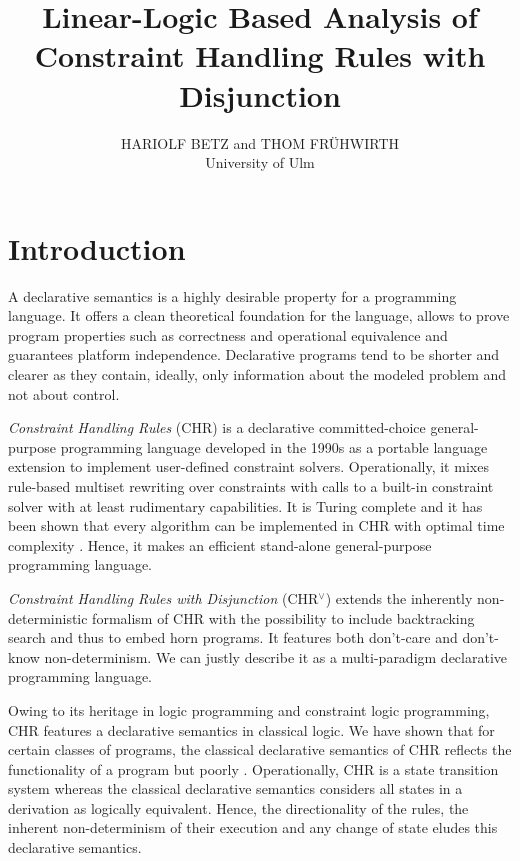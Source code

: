 \documentclass[acmtocl]{acmtrans2m}
\title{Linear-Logic Based Analysis of Constraint Handling Rules with Disjunction}
\author{HARIOLF BETZ and THOM FR\"UHWIRTH\\
University of Ulm\\
}
\begin{document}
\begin{bottomstuff}
\end{bottomstuff}

\maketitle

\section{Introduction}
A declarative semantics is a highly desirable property for a programming
language. It offers a clean theoretical foundation for the language, allows to
prove program properties such as correctness and operational equivalence and
guarantees platform independence. Declarative programs tend to be shorter and
clearer as they contain, ideally, only information about the modeled problem and
not about control.

\emph{Constraint Handling Rules} (CHR)
\cite{DBLP:journals/lncs/Fruhwirth94,DBLP:journals/jlp/Fruhwirth98,fruehwirth09}
is a declarative committed-choice general-purpose programming language developed
in the 1990s as a portable language extension to implement user-defined
constraint solvers. Operationally, it mixes rule-based multiset rewriting over
constraints with calls to a built-in constraint solver with at least rudimentary
capabilities. It is Turing complete and it has been shown that every algorithm
can be implemented in CHR with optimal time complexity
\cite{Sneyers05thecomputational}. Hence, it makes an efficient stand-alone
general-purpose programming language.

\emph{Constraint Handling Rules with Disjunction} (CHR$^\vee$)
\cite{DBLP:conf/fqas/AbdennadherS98} extends the inherently non-deterministic
formalism of CHR with the possibility to include backtracking search and thus to
embed horn programs. It features both don't-care and don't-know
non-determinism. We can justly describe it as a multi-paradigm declarative
programming language.

Owing to its heritage in logic programming and constraint logic programming,
CHR features a declarative semantics in classical logic. We have
shown that for certain classes of programs, the classical declarative semantics
of CHR reflects the functionality of a program but poorly
\cite{DBLP:conf/cp/BetzF05}. Operationally, CHR is a state transition system
whereas the classical declarative semantics considers all states in a derivation
as logically equivalent. Hence, the directionality of the rules, the inherent
non-determinism of their execution and any change of state eludes this
declarative semantics.
\end{document}
